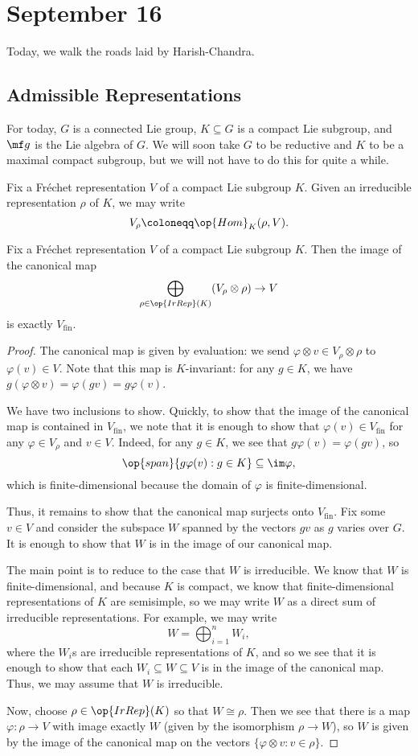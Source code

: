 \documentclass[../notes.tex]{subfiles}
\begin{document}
\section{September 16}
Today, we walk the roads laid by Harish-Chandra.

\subsection{Admissible Representations}
For today, $G$ is a connected Lie group, $K\subseteq G$ is a compact Lie subgroup, and $\mf g$ is the Lie algebra of $G$. We will soon take $G$ to be reductive and $K$ to be a maximal compact subgroup, but we will not have to do this for quite a while.
\begin{notation}
	Fix a Fr\'echet representation $V$ of a compact Lie subgroup $K$. Given an irreducible representation $\rho$ of $K$, we may write
	\[V_\rho\coloneqq\op{Hom}_K(\rho,V).\]
\end{notation}
\begin{lemma}
	Fix a Fr\'echet representation $V$ of a compact Lie subgroup $K$. Then the image of the canonical map
	\[\bigoplus_{\rho\in\op{IrRep}(K)}(V_\rho\otimes\rho)\to V\]
	is exactly $V_{\mathrm{fin}}$.
\end{lemma}
\begin{proof}
	The canonical map is given by evaluation: we send $\varphi\otimes v\in V_\rho\otimes\rho$ to $\varphi(v)\in V$. Note that this map is $K$-invariant: for any $g\in K$, we have $g(\varphi\otimes v)=\varphi(gv)=g\varphi(v)$.

	We have two inclusions to show. Quickly, to show that the image of the canonical map is contained in $V_{\mathrm{fin}}$, we note that it is enough to show that $\varphi(v)\in V_{\mathrm{fin}}$ for any $\varphi\in V_\rho$ and $v\in V$. Indeed, for any $g\in K$, we see that $g\varphi(v)=\varphi(gv)$, so
	\[\op{span}\{g\varphi(v):g\in K\}\subseteq\im\varphi,\]
	which is finite-dimensional because the domain of $\varphi$ is finite-dimensional.

	Thus, it remains to show that the canonical map surjects onto $V_{\mathrm{fin}}$. Fix some $v\in V$ and consider the subspace $W$ spanned by the vectors $gv$ as $g$ varies over $G$. It is enough to show that $W$ is in the image of our canonical map.
	
	The main point is to reduce to the case that $W$ is irreducible. We know that $W$ is finite-dimensional, and because $K$ is compact, we know that finite-dimensional representations of $K$ are semisimple, so we may write $W$ as a direct sum of irreducible representations. For example, we may write
	\[W=\bigoplus_{i=1}^nW_i,\]
	where the $W_i$s are irreducible representations of $K$, and so we see that it is enough to show that each $W_i\subseteq W\subseteq V$ is in the image of the canonical map. Thus, we may assume that $W$ is irreducible.

	Now, choose $\rho\in\op{IrRep}(K)$ so that $W\cong\rho$. Then we see that there is a map $\varphi\colon\rho\to V$ with image exactly $W$ (given by the isomorphism $\rho\to W$), so $W$ is given by the image of the canonical map on the vectors $\{\varphi\otimes v:v\in\rho\}$.
\end{proof}
\end{document}
